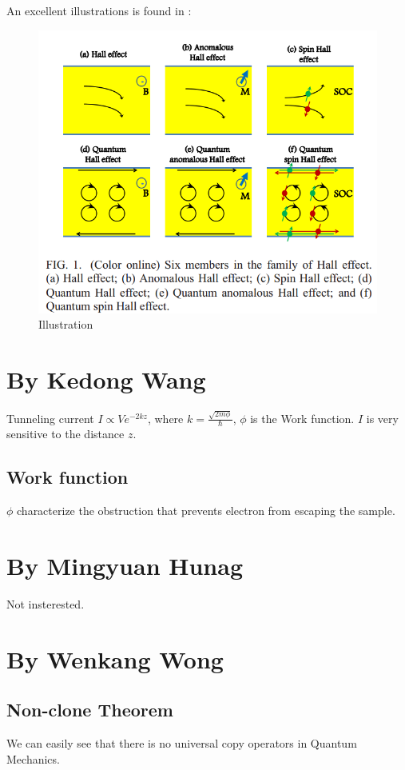 \documentclass{article}
\numberwithin{equation}{subsection} %
\theoremstyle{definition}
\begin{document}
An excellent illustrations is found in \cite{Arxiv-Xiao}:
\begin{figure}[H]
    \centering
    \includegraphics[width=0.8\linewidth]{pics/1}
    \caption{Illustration}
    \label{fig:Xiao Illustration}
\end{figure}

\section{By Kedong Wang}
Tunneling current $I\propto V e^{-2kz}$, where 
$k = \frac{\sqrt{2m\phi}}{\hbar}$, $\phi$ is the Work function.
$I$ is very sensitive to the distance $z$.

\subsection{Work function} $\phi$ characterize the obstruction
that prevents electron from escaping the sample.

\section{By Mingyuan Hunag}
Not insterested.

\section{By Wenkang Wong}
\subsection{Non-clone Theorem} We can easily see that there is no universal
copy operators in Quantum Mechanics.
\end{document}
